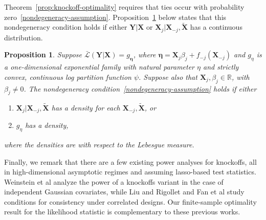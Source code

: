 \documentclass[12pt]{article}
\newtheorem{proposition}{Proposition}
\theoremstyle{definition}
\theoremstyle{remark}
\newcommand{\prx}{\bm X}
\newcommand{\srx}{X}
\newcommand{\srz}{Z}
\newcommand{\prxk}{{{\widetilde{\bm X}}}}
\newcommand{\srxk}{\widetilde X}
\newcommand{\pry}{{\bm Y}}
\newcommand{\sry}{Y}
\begin{document}
Theorem~\ref{prop:knockoff-optimality} requires that ties occur with probability zero~\eqref{nondegeneracy-assumption}. Proposition~\ref{prop:nondegeneracy-knockoffs} below states that this nondegeneracy condition holds if either $\pry|\prx$ or $\prx_j|\prx_{-j}, \prxk$ has a continuous distribution.
\begin{proposition}\label{prop:nondegeneracy-knockoffs}
	Suppose $\bar{\mathcal L}(\pry|\prx) = g_{\bm\eta}$, where $\bm \eta = \prx_j \beta_j + f_{-j}(\prx_{-j})$ and $g_\eta$ is a one-dimensional exponential family with natural parameter $\eta$ and strictly convex, continuous log partition function $\psi$. Suppose also that $\prx_j, \beta_j \in \mathbb R$, with $\beta_j \neq 0$. The nondegeneracy condition~\eqref{nondegeneracy-assumption} holds if either 
	\begin{enumerate}
		\item $\prx_{j}|\prx_{-j}, \prxk$ has a density for each $\prx_{-j}, \prxk$, or
		\item $g_\eta$ has a density,
	\end{enumerate}
	where the densities are with respect to the Lebesgue measure.
\end{proposition}

Finally, we remark that there are a few existing power analyses for knockoffs, all in high-dimensional asymptotic regimes and assuming lasso-based test statistics. Weinstein et al \cite{Weinstein2017} analyze the power of a knockoffs variant in the case of independent Gaussian covariates, while Liu and Rigollet \cite{Liu2019} and Fan et al \cite{Fan2020} study conditions for consistency under correlated designs. Our finite-sample optimality result for the likelihood statistic is complementary to these previous works.
\end{document}
